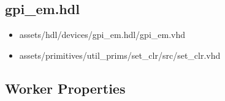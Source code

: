 \documentclass{article}
\begin{document}
\subsection*{gpi\_em.hdl}
	\begin{itemize}
		\item assets/hdl/devices/gpi\_em.hdl/gpi\_em.vhd
		\item assets/primitives/util\_prims/set\_clr/src/set\_clr.vhd
	\end{itemize}
	
\begin{landscape}
\section*{Worker Properties}

\begin{flushleft}


\end{flushleft}
\end{landscape}
\end{document}
